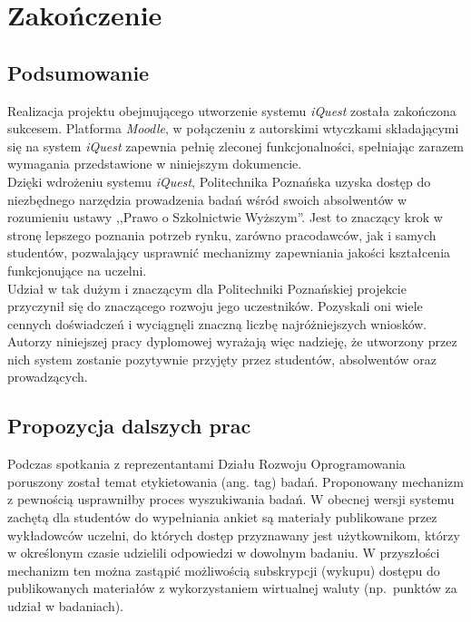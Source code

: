 \chapter{Zakończenie}
\label{Chapter9}

\section{Podsumowanie}
\label{Chapter91}

Realizacja projektu obejmującego utworzenie systemu \textit{iQuest} została zakończona sukcesem. Platforma \textit{Moodle}, w połączeniu z autorskimi wtyczkami składającymi się na system \textit{iQuest} zapewnia pełnię zleconej funkcjonalności, spełniając zarazem wymagania przedstawione w niniejszym dokumencie. \\

Dzięki wdrożeniu systemu \textit{iQuest}, Politechnika Poznańska uzyska dostęp do niezbędnego narzędzia prowadzenia badań wśród swoich absolwentów w rozumieniu ustawy ,,Prawo o Szkolnictwie Wyższym''. Jest to znaczący krok w stronę lepszego poznania potrzeb rynku, zarówno pracodawców, jak i samych studentów, pozwalający usprawnić mechanizmy zapewniania jakości kształcenia funkcjonujące na uczelni. \\

Udział w tak dużym i znaczącym dla Politechniki Poznańskiej projekcie przyczynił się do znaczącego rozwoju jego uczestników. Pozyskali oni wiele cennych doświadczeń i wyciągnęli znaczną liczbę najróżniejszych wniosków. Autorzy niniejszej pracy dyplomowej wyrażają więc nadzieję, że utworzony przez nich system zostanie pozytywnie przyjęty przez studentów, absolwentów oraz prowadzących.

\section{Propozycja dalszych prac}
\label{Chapter92}

Podczas spotkania z reprezentantami Działu Rozwoju Oprogramowania poruszony został temat etykietowania (ang. tag) badań. Proponowany mechanizm z pewnością usprawniłby proces wyszukiwania badań. W obecnej wersji systemu zachętą dla studentów do wypełniania ankiet są materiały publikowane przez wykładowców uczelni, do których dostęp przyznawany jest użytkownikom, którzy w określonym czasie udzielili odpowiedzi w dowolnym badaniu. W przyszłości mechanizm ten można zastąpić możliwością subskrypcji (wykupu) dostępu do publikowanych materiałów z wykorzystaniem wirtualnej waluty (np.~punktów za udział w badaniach).